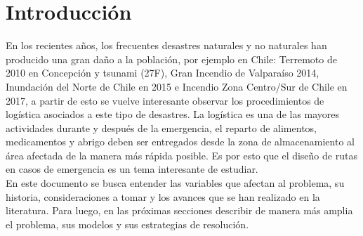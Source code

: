 \section{Introducción}
En los recientes años, los frecuentes desastres naturales y no naturales han producido una gran daño a la población, por ejemplo en Chile: Terremoto de 2010 en Concepción y tsunami (27F), Gran Incendio de Valparaíso 2014, Inundación del Norte de Chile en 2015 e Incendio Zona Centro/Sur de Chile en 2017, a partir de esto se vuelve interesante observar los procedimientos de logística asociados a este tipo de desastres. La logística es una de las mayores actividades durante y después de la emergencia, el reparto de alimentos, medicamentos y abrigo deben ser entregados desde la zona de almacenamiento al área afectada de la manera más rápida posible. Es por esto que el diseño de rutas en casos de emergencia es un tema interesante de estudiar. \\
En este documento se busca entender las variables que afectan al problema, su historia, consideraciones a tomar y los avances que se han realizado en la literatura. Para luego, en las próximas secciones describir de manera más amplia el problema, sus modelos y sus estrategias de resolución. 

